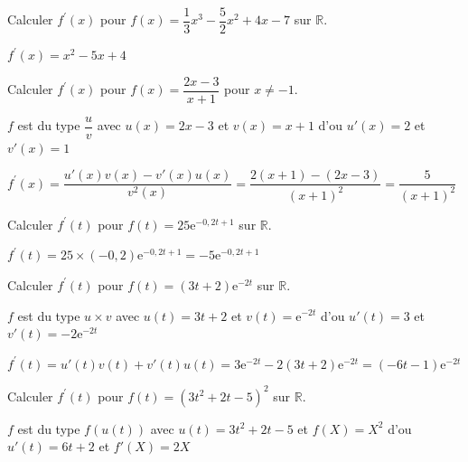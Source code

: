\documentclass[11pt,a4paper]{article}  %
\begin{document}
	\graphicspath{{images/}}

	\begin{center}

	\end{center}

\vspace*{-0.5cm}

\begin{enumMet}
	\item Calculer $f^{\prime}(x)$ pour $f(x)=\dfrac{1}{3} x^3-\dfrac{5}{2} x^2+4 x-7$ sur $\mathbb{R}$.
	\begin{corrBox}
		$f^{\prime}(x)=x^2-5x+4$
	\end{corrBox}
	\item Calculer $f^{\prime}(x)$ pour $f(x)=\dfrac{2x-3}{x+1}$ pour $x \neq -1$.
	\begin{corrBox}
		$f$ est du type $\dfrac{u}{v}$ avec $u(x)=2x-3$ et $v(x)=x+1$ d'ou $u'(x)=2$ et $v'(x)=1$

		$f^{\prime}(x)=\dfrac{u'(x)v(x)-v'(x)u(x)}{v^2(x)}=\dfrac{2(x+1)-(2x-3)}{(x+1)^2}=\dfrac{5}{(x+1)^2}$
	\end{corrBox}
	\item Calculer $f^{\prime}(t)$ pour $f(t)=25 \mathrm{e}^{-0,2 t+1}$ sur $\mathbb{R}$.
	\begin{corrBox}
		$f^{\prime}(t)=25\times (-0,2)\mathrm{e}^{-0,2 t+1}=-5\mathrm{e}^{-0,2 t+1}$
	\end{corrBox}
	\item Calculer $f^{\prime}(t)$ pour $f(t)=(3 t+2) \mathrm{e}^{-2t}$ sur $\mathbb{R}$.
	\begin{corrBox}
		$f$ est du type $u\times v$ avec $u(t)=3t+2$ et $v(t)=\mathrm{e}^{-2t}$ d'ou $u'(t)=3$ et $v'(t)=-2\mathrm{e}^{-2t}$

		$f^{\prime}(t)=u'(t)v(t)+v'(t)u(t)=3\mathrm{e}^{-2t}-2(3t+2)\mathrm{e}^{-2t}=(-6t-1)\mathrm{e}^{-2t}$
	\end{corrBox}
	\item Calculer $f^{\prime}(t)$ pour $f(t)=\left(3 t^2+2 t-5\right)^2$ sur $\mathbb{R}$.
	\begin{corrBox}
		$f$ est du type $f(u(t))$ avec $u(t)=3t^2+2t-5$ et $f(X)=X^2$ d'ou $u'(t)=6t+2$ et $f'(X)=2X$


\end{corrBox}
\end{enumMet}
\end{document}
